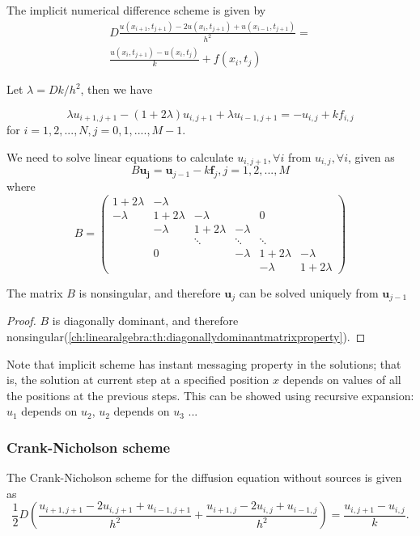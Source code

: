\begin{refsection}
\begin{definition}
The implicit numerical difference scheme is given by
\begin{align*}
D\frac{u(x_{i+1},t_{j+1}) - 2u(x_i,t_{j+1}) + u(x_{i-1},t_{j+1})}{h^2} =\\ \frac{u(x_i,t_{j+1})-u(x_i,t_{j})}{k} + f(x_i,t_j)    
\end{align*}

Let $\lambda = Dk/h^2$, then we have

$$ \lambda u_{i+1,j+1} - (1+2\lambda) u_{i,j+1} + \lambda u_{i-1,j+1} = -u_{i,j} + kf_{i,j}$$
for $i=1,2,...,N,j=0,1,....,M-1$.

We need to solve linear equations to calculate $u_{i,j+1},\forall i$ from $u_{i,j},\forall i$, given as
$$B\bm{u_j} = \bm{u}_{j-1} - k\bm{f}_j, j=1,2,...,M$$
where
$$B = \begin{pmatrix}
1+2\lambda & -\lambda &  &  &  & \\ 
-\lambda & 1+2\lambda & -\lambda &  & 0 & \\ 
&  -\lambda & 1+2\lambda & -\lambda   &  & \\ 
&  &  \ddots & \ddots & \ddots & \\ 
& 0 &  &  -\lambda & 1+2\lambda & -\lambda  \\ 
&  &  &  &  -\lambda & 1+2\lambda
\end{pmatrix}$$
\end{definition}




\begin{lemma}
The matrix $B$ is nonsingular, and therefore $\bm{u}_j$ can be solved uniquely from $\bm{u}_{j-1}$
\end{lemma}
\begin{proof}
$B$ is diagonally dominant, and therefore nonsingular(\autoref{ch:linearalgebra:th:diagonallydominantmatrixproperty}).
\end{proof}

\begin{remark}
	Note that implicit scheme has instant messaging property in the solutions; that is, the solution at current step at a specified position $x$ depends on values of all the positions at the previous steps. This can be showed using recursive expansion: $u_1$ depends on $u_2$, $u_2$ depends on $u_3$ ...
\end{remark}


\subsubsection{Crank-Nicholson scheme}
\begin{definition}
The Crank-Nicholson scheme for the diffusion equation without sources is given as
$$\frac{1}{2}D(\frac{u_{i+1,j+1} - 2u_{i,j+1} + u_{i-1,j+1}}{h^2} + \frac{u_{i+1,j} - 2u_{i,j} + u_{i-1,j}}{h^2} ) = \frac{u_{i,j+1}-u_{i,j}}{k}.$$
\end{definition}


\end{refsection}

